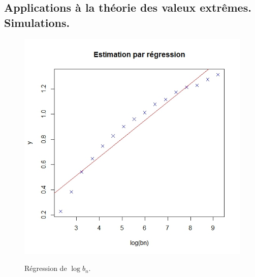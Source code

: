 \documentclass{article}
\theoremstyle{definition}
\begin{document}
\subsection{Applications à la théorie des valeux extrêmes. Simulations.}

\begin{figure}[!h]\centering
\includegraphics[scale=0.4]{RegGauss.jpeg}
\label{RegGauss}
\caption{Régression de $\log b_n$.}
\end{figure}



 
\nocite{*}
\end{document}
